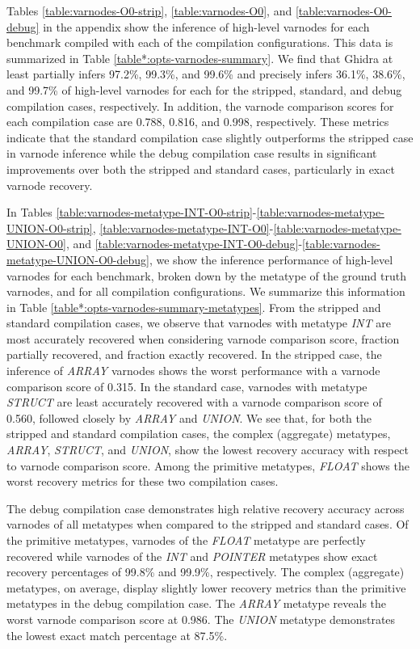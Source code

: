 

Tables \ref{table:varnodes-O0-strip}, \ref{table:varnodes-O0}, and \ref{table:varnodes-O0-debug} in the appendix show the inference of high-level varnodes for each benchmark compiled with each of the compilation configurations. This data is summarized in Table \ref{table*:opts-varnodes-summary}. We find that Ghidra at least partially infers 97.2\%, 99.3\%, and 99.6\% and precisely infers 36.1\%, 38.6\%, and 99.7\% of high-level varnodes for each for the stripped, standard, and debug compilation cases, respectively. In addition, the varnode comparison scores for each compilation case are 0.788, 0.816, and 0.998, respectively. These metrics indicate that the standard compilation case slightly outperforms the stripped case in varnode inference while the debug compilation case results in significant improvements over both the stripped and standard cases, particularly in exact varnode recovery.



In Tables \ref{table:varnodes-metatype-INT-O0-strip}-\ref{table:varnodes-metatype-UNION-O0-strip}, \ref{table:varnodes-metatype-INT-O0}-\ref{table:varnodes-metatype-UNION-O0}, and \ref{table:varnodes-metatype-INT-O0-debug}-\ref{table:varnodes-metatype-UNION-O0-debug}, we show the inference performance of high-level varnodes for each benchmark, broken down by the metatype of the ground truth varnodes, and for all compilation configurations. We summarize this information in Table \ref{table*:opts-varnodes-summary-metatypes}. From the stripped and standard compilation cases, we observe that varnodes with metatype \emph{INT} are most accurately recovered when considering varnode comparison score, fraction partially recovered, and fraction exactly recovered. In the stripped case, the inference of \emph{ARRAY} varnodes shows the worst performance with a varnode comparison score of 0.315. In the standard case, varnodes with metatype \emph{STRUCT} are least accurately recovered with a varnode comparison score of 0.560, followed closely by \emph{ARRAY} and \emph{UNION}. We see that, for both the stripped and standard compilation cases, the complex (aggregate) metatypes, \emph{ARRAY}, \emph{STRUCT}, and \emph{UNION}, show the lowest recovery accuracy with respect to varnode comparison score. Among the primitive metatypes, \emph{FLOAT} shows the worst recovery metrics for these two compilation cases.

The debug compilation case demonstrates high relative recovery accuracy across varnodes of all metatypes when compared to the stripped and standard cases. Of the primitive metatypes, varnodes of the \emph{FLOAT} metatype are perfectly recovered while varnodes of the \emph{INT} and \emph{POINTER} metatypes show exact recovery percentages of 99.8\% and 99.9\%, respectively. The complex (aggregate) metatypes, on average, display slightly lower recovery metrics than the primitive metatypes in the debug compilation case. The \emph{ARRAY} metatype reveals the worst varnode comparison score at 0.986. The \emph{UNION} metatype demonstrates the lowest exact match percentage at 87.5\%.


